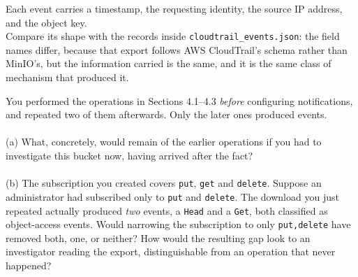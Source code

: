 \noindent
Each event carries a timestamp, the requesting identity, the source IP address, and the object key.\\
Compare its shape with the records inside \texttt{cloudtrail\_events.json}: the field names differ, because that export follows AWS CloudTrail's schema rather than MinIO's, but the information carried is the same, and it is the same class of mechanism that produced it.

\begin{questionbox}
You performed the operations in Sections 4.1--4.3 \emph{before} configuring notifications, and
repeated two of them afterwards. Only the later ones produced events.\\
\\
(a) What, concretely, would remain of the earlier operations if you had to investigate this
bucket now, having arrived after the fact?\\
\\
(b) The subscription you created covers \texttt{put}, \texttt{get} and \texttt{delete}. Suppose an
administrator had subscribed only to \texttt{put} and \texttt{delete}. The download you just
repeated actually produced \emph{two} events, a \texttt{Head} and a \texttt{Get}, both classified
as object-access events. Would narrowing the subscription to only \texttt{put,delete} have
removed both, one, or neither? How would the resulting gap look to an investigator reading the
export, distinguishable from an operation that never happened?
\end{questionbox}

\begin{answerbox}
\vspace{4cm}
\end{answerbox}
